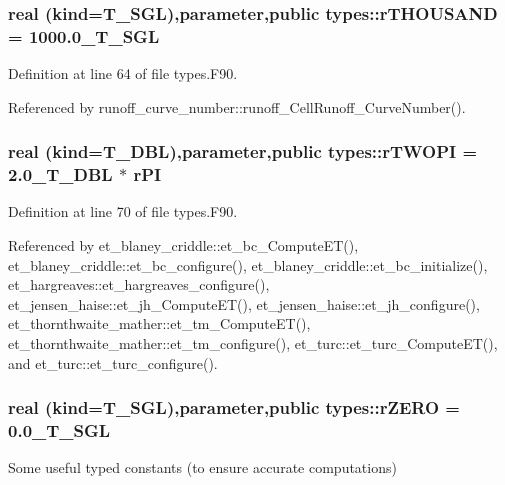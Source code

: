 \hypertarget{namespacetypes_a46c52dedd7fb25f5de9fdbd1ce795aaa}{
\subsubsection[{rTHOUSAND}]{\setlength{\rightskip}{0pt plus 5cm}real (kind={\bf T\_\-SGL}),parameter,public {\bf types::rTHOUSAND} = 1000.0\_\-T\_\-SGL}}
\label{namespacetypes_a46c52dedd7fb25f5de9fdbd1ce795aaa}


Definition at line 64 of file types.F90.



Referenced by runoff\_\-curve\_\-number::runoff\_\-CellRunoff\_\-CurveNumber().

\hypertarget{namespacetypes_ae0e7691ed560223af53b3ff28efafc11}{
\subsubsection[{rTWOPI}]{\setlength{\rightskip}{0pt plus 5cm}real (kind={\bf T\_\-DBL}),parameter,public {\bf types::rTWOPI} = 2.0\_\-T\_\-DBL $\ast$ rPI}}
\label{namespacetypes_ae0e7691ed560223af53b3ff28efafc11}


Definition at line 70 of file types.F90.



Referenced by et\_\-blaney\_\-criddle::et\_\-bc\_\-ComputeET(), et\_\-blaney\_\-criddle::et\_\-bc\_\-configure(), et\_\-blaney\_\-criddle::et\_\-bc\_\-initialize(), et\_\-hargreaves::et\_\-hargreaves\_\-configure(), et\_\-jensen\_\-haise::et\_\-jh\_\-ComputeET(), et\_\-jensen\_\-haise::et\_\-jh\_\-configure(), et\_\-thornthwaite\_\-mather::et\_\-tm\_\-ComputeET(), et\_\-thornthwaite\_\-mather::et\_\-tm\_\-configure(), et\_\-turc::et\_\-turc\_\-ComputeET(), and et\_\-turc::et\_\-turc\_\-configure().

\hypertarget{namespacetypes_accfc31d1cd5f1a46b3fb99e6d1975a6b}{
\subsubsection[{rZERO}]{\setlength{\rightskip}{0pt plus 5cm}real (kind={\bf T\_\-SGL}),parameter,public {\bf types::rZERO} = 0.0\_\-T\_\-SGL}}
\label{namespacetypes_accfc31d1cd5f1a46b3fb99e6d1975a6b}


Some useful typed constants (to ensure accurate computations) 



